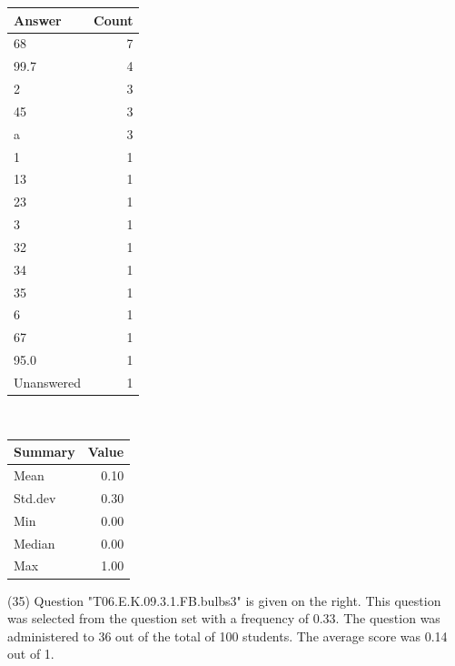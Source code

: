 \documentclass[12pt,nohyper]{tufte-handout}\usepackage[]{graphicx}\usepackage[]{color}
\begin{document}
\begin{center}%
\begin{tabular}{lr}
  \hline
Answer & Count \\ 
  \hline
68 &   7 \\ 
  99.7 &   4 \\ 
  2 &   3 \\ 
  45 &   3 \\ 
  a &   3 \\ 
  1 &   1 \\ 
  13 &   1 \\ 
  23 &   1 \\ 
  3 &   1 \\ 
  32 &   1 \\ 
  34 &   1 \\ 
  35 &   1 \\ 
  6 &   1 \\ 
  67 &   1 \\ 
  95.0 &   1 \\ 
  Unanswered &   1 \\ 
   \hline
\end{tabular}
~~~~~~~~%
\begin{tabular}{lr}
  \hline
Summary & Value \\ 
  \hline
Mean & 0.10 \\ 
  Std.dev & 0.30 \\ 
  Min & 0.00 \\ 
  Median & 0.00 \\ 
  Max & 1.00 \\ 
   \hline
\end{tabular}
\end{center}\newpage{} (35) Question "T06.E.K.09.3.1.FB.bulbs3" is given on the right. This question was selected from the question set with a frequency of 0.33. The question was administered to 36 out of the total of 100 students. The average score was 0.14 out of 1.
\end{document}
